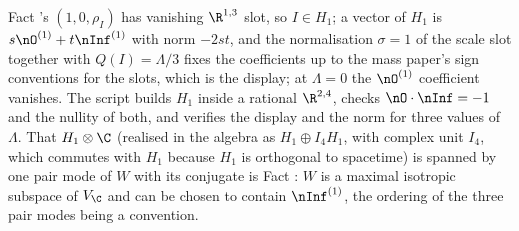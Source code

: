 Fact 's $(1, 0, \rho_{I})$ has vanishing $\R^{1,3}$ slot, so $I \in H_{1}$; a vector of $H_{1}$ is $s\nO^{(1)} + t\nInf^{(1)}$ with norm $-2st$, and the normalisation $\sigma = 1$ of the scale slot together with $Q(I) = \Lambda/3$ fixes the coefficients up to the mass paper's sign conventions for the slots, which is the display; at $\Lambda = 0$ the $\nO^{(1)}$ coefficient vanishes. The script builds $H_{1}$ inside a rational $\R^{2,4}$, checks $\nO \cdot \nInf = -1$ and the nullity of both, and verifies the display and the norm for three values of $\Lambda$. That $H_{1} \otimes \C$ (realised in the algebra as $H_{1} \oplus I_{4}H_{1}$, with complex unit $I_{4}$, which commutes with $H_{1}$ because $H_{1}$ is orthogonal to spacetime) is spanned by one pair mode of $W$ with its conjugate is Fact : $W$ is a maximal isotropic subspace of $V_{\C}$ and can be chosen to contain $\nInf^{(1)}$, the ordering of the three pair modes being a convention.

